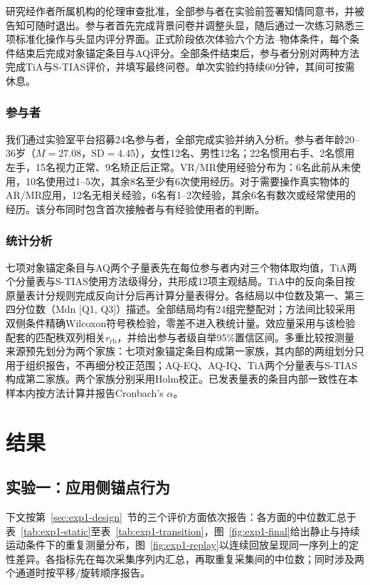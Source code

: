 \documentclass[review]{vgtc}
\begin{document}
研究经作者所属机构的伦理审查批准，全部参与者在实验前签署知情同意书，并被告知可随时退出。参与者首先完成背景问卷并调整头显，随后通过一次练习熟悉三项标准化操作与头显内评分界面。正式阶段依次体验六个方法--物体条件，每个条件结束后完成对象锚定条目与AQ评分。全部条件结束后，参与者分别对两种方法完成TiA与S-TIAS评价，并填写最终问卷。单次实验约持续60分钟，其间可按需休息。

\subsubsection{参与者}

我们通过实验室平台招募24名参与者，全部完成实验并纳入分析。参与者年龄20--36岁（$M=27.08$，$\mathrm{SD}=4.45$），女性12名、男性12名；22名惯用右手、2名惯用左手，15名视力正常、9名矫正后正常。VR/MR使用经验分布为：6名此前从未使用，10名使用过1--5次，其余8名至少有6次使用经历。对于需要操作真实物体的AR/MR应用，12名无相关经验，6名有1--2次经验，其余6名有数次或经常使用的经历。该分布同时包含首次接触者与有经验使用者的判断。

\subsubsection{统计分析}

七项对象锚定条目与AQ两个子量表先在每位参与者内对三个物体取均值，TiA两个分量表与S-TIAS使用方法级得分，共形成12项主观结局。TiA中的反向条目按原量表计分规则完成反向计分后再计算分量表得分。各结局以中位数及第一、第三四分位数（Mdn [Q1, Q3]）描述。全部结局均有24组完整配对；方法间比较采用双侧条件精确Wilcoxon符号秩检验，零差不进入秩统计量。效应量采用与该检验配套的匹配秩双列相关$r_{\mathrm{rb}}$，并给出参与者级自举95\%置信区间。多重比较按测量来源预先划分为两个家族：七项对象锚定条目构成第一家族，其内部的两组划分只用于组织报告，不再细分校正范围；AQ-EQ、AQ-IQ、TiA两个分量表与S-TIAS构成第二家族。两个家族分别采用Holm校正。已发表量表的条目内部一致性在本样本内按方法计算并报告Cronbach's $\alpha$。

\section{结果}\label{sec:results}

\subsection{实验一：应用侧锚点行为}

下文按第~\ref{sec:exp1-design}~节的三个评价方面依次报告：各方面的中位数汇总于表~\ref{tab:exp1-static}至表~\ref{tab:exp1-transition}，图~\ref{fig:exp1-final}给出静止与持续运动条件下的重复测量分布，图~\ref{fig:exp1-replay}以连续回放呈现同一序列上的定性差异。各指标先在每次采集序列内汇总，再取重复采集间的中位数；同时涉及两个通道时按平移/旋转顺序报告。
\end{document}
